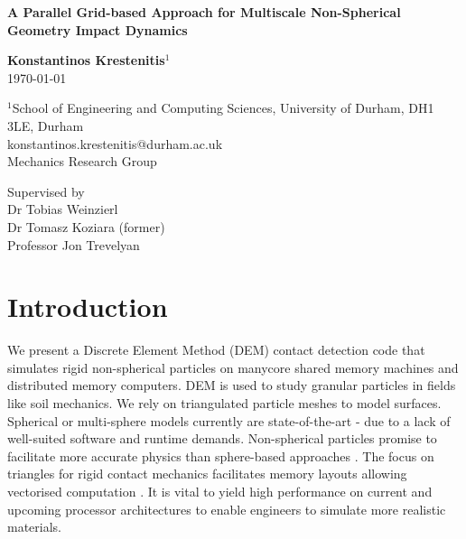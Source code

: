 \documentclass[times,12pt]{article}
\begin{document}
\pagestyle{plain}

\begin{center}
{\fontsize{22}{20}\bf A Parallel Grid-based Approach for Multiscale Non-Spherical Geometry Impact Dynamics\\
}\end{center}

\vspace{\fill}
\begin{center}\fontsize{16}{20}
\textbf{Konstantinos Krestenitis$^1$}\\
\today
\end{center}
\vspace{\fill}

\begin{center}
{\fontsize{10}{12}
}\end{center}

\begin{center}
$^1$School of Engineering and Computing Sciences, University of Durham, DH1 3LE, Durham\\
konstantinos.krestenitis@durham.ac.uk\\
Mechanics Research Group\\
\end{center}
\begin{center}
Supervised by\\
Dr Tobias Weinzierl\\
Dr Tomasz Koziara (former)\\
Professor Jon Trevelyan\\
\end{center}

\clearpage

\tableofcontents

\clearpage

\section{Introduction}
We present a Discrete Element Method (DEM) contact detection code that simulates rigid non-spherical particles on manycore shared memory machines and distributed memory computers. DEM is used to study granular particles in fields like soil mechanics. We rely on triangulated particle meshes to model surfaces. Spherical or multi-sphere models currently are state-of-the-art - due to a lack of well-suited software and runtime demands. Non-spherical particles promise to facilitate more accurate physics than sphere-based approaches \cite{AlonsoMarroqu2013}. The focus on triangles for rigid contact mechanics facilitates memory layouts allowing vectorised computation \cite{Alvarez2007, Koziara2005, Krestenitis2015}. It is vital to yield high performance on current and upcoming processor architectures to enable engineers to simulate more realistic materials.
\end{document}
